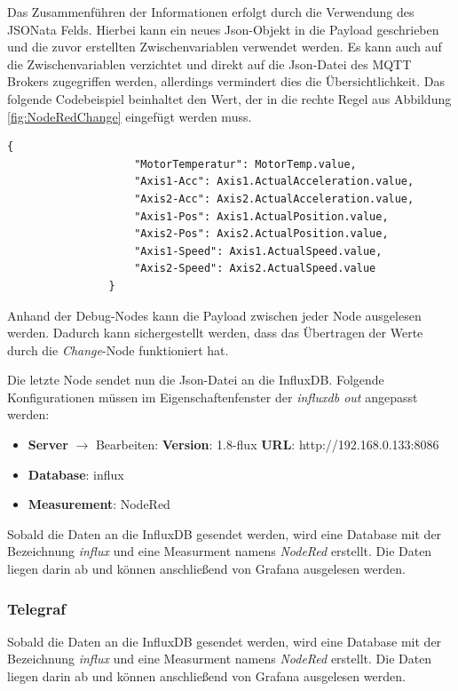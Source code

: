 \documentclass[a4paper, 12pt, oneside, toc=listofnumbered, bibliography=totoc]{scrbook}
\begin{document}
			Das Zusammenführen der Informationen erfolgt durch die Verwendung des JSONata Felds. Hierbei kann ein neues Json-Objekt in die Payload geschrieben und die zuvor erstellten Zwischenvariablen verwendet werden. Es kann auch auf die Zwischenvariablen verzichtet und direkt auf die Json-Datei des MQTT Brokers zugegriffen werden, allerdings vermindert dies die Übersichtlichkeit. Das folgende Codebeispiel beinhaltet den Wert, der in die rechte Regel aus Abbildung \ref{fig:NodeRedChange} eingefügt werden muss.
			
			\begin{lstlisting}[numbers=none, frame=single]
				{
					"MotorTemperatur": MotorTemp.value,
					"Axis1-Acc": Axis1.ActualAcceleration.value,
					"Axis2-Acc": Axis2.ActualAcceleration.value,
					"Axis1-Pos": Axis1.ActualPosition.value,
					"Axis2-Pos": Axis2.ActualPosition.value,
					"Axis1-Speed": Axis1.ActualSpeed.value,
					"Axis2-Speed": Axis2.ActualSpeed.value
				}
			\end{lstlisting}
		
			Anhand der Debug-Nodes kann die Payload zwischen jeder Node ausgelesen werden. Dadurch kann sichergestellt werden, dass das Übertragen der Werte durch die \textit{Change}-Node funktioniert hat. 
			
			Die letzte Node sendet nun die Json-Datei an die InfluxDB. Folgende Konfigurationen müssen im Eigenschaftenfenster der \textit{influxdb out} angepasst werden:
			
			\begin{itemize}
				\item \textbf{Server} $\rightarrow$ Bearbeiten:
				\subitem \textbf{Version}: 1.8-flux
				\subitem \textbf{URL}: http://192.168.0.133:8086
				\item \textbf{Database}: influx
				\item \textbf{Measurement}: NodeRed
			\end{itemize}
			
			Sobald die Daten an die InfluxDB gesendet werden, wird eine Database mit der Bezeichnung \textit{influx} und eine Measurment namens \textit{NodeRed} erstellt. Die Daten liegen darin ab und können anschließend von Grafana ausgelesen werden.
			
			\subsubsection{Telegraf}
		
				Sobald die Daten an die InfluxDB gesendet werden, wird eine Database mit der Bezeichnung \textit{influx} und eine Measurment namens \textit{NodeRed} erstellt. Die Daten liegen darin ab und können anschließend von Grafana ausgelesen werden.
			
\end{document}
